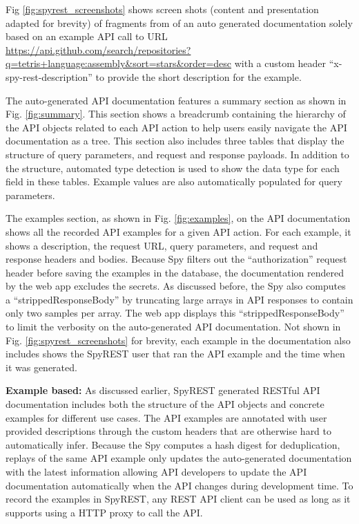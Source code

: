 \documentclass[conference]{IEEEtran}
\begin{document}
Fig \ref{fig:spyrest_screenshots} shows screen shots  (content and presentation adapted for brevity) of fragments from of an auto generated documentation solely based on an example API call to URL \url{https://api.github.com/search/repositories?q=tetris+language:assembly&sort=stars&order=desc} with a custom header ``x-spy-rest-description'' to provide the short description for the example.

The auto-generated API documentation features a summary section as shown in Fig. \ref{fig:summary}. This section shows a breadcrumb containing the hierarchy of the API objects related to each API action to help users easily navigate the API documentation as a tree. This section also includes three tables that display the structure of query parameters, and request and response payloads. In addition to the structure, automated type detection is used to show the data type for each field in these tables. Example values are also automatically populated for query parameters.

The examples section, as shown in Fig. \ref{fig:examples}, on the API documentation shows all the recorded API examples for a given API action. For each example, it shows a description, the request URL, query parameters, and request and response headers and bodies. Because Spy filters out the ``authorization'' request header before saving the examples in the database, the documentation rendered by the web app excludes the secrets. As discussed before, the Spy also computes a ``strippedResponseBody'' by truncating large arrays in API responses to contain only two samples per array. The web app displays this ``strippedResponseBody'' to limit the verbosity on the auto-generated API documentation. Not shown in Fig. \ref{fig:spyrest_screenshots} for brevity, each example in the documentation also includes shows the SpyREST user that ran the API example and the time when it was generated.

\textbf{Example based:} As discussed earlier, SpyREST generated RESTful API documentation includes both the structure of the API objects and concrete examples for different use cases. The API examples are annotated with user provided descriptions through the custom headers that are otherwise hard to automatically infer. Because the Spy computes a hash digest for deduplication, replays of the same API example only updates the auto-generated documentation with the latest information allowing API developers to update the API documentation automatically when the API changes during development time. To record the examples in SpyREST, any REST API client can be used as long as it supports using a HTTP proxy to call the API.
\end{document}
